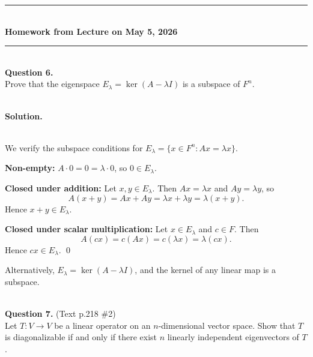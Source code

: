 \documentclass{article}
\begin{document}
\bigskip


\bigskip
\begin{center}
\rule{0.5\textwidth}{1pt}\\[6pt]
\textbf{Homework from Lecture on May 5, 2026}\\[2pt]
\rule{0.5\textwidth}{1pt}
\end{center}
\bigskip


\hfill \break  $~\!\!$ \dotfill \medskip \\
\textbf{Question 6.}\\
Prove that the eigenspace $E_\lambda = \ker(A - \lambda I)$ is a subspace of $F^n$.

\noindent\\
\textbf{Solution.}\\
\quad\\
\begin{mdframed}[linewidth=1pt]
We verify the subspace conditions for $E_\lambda = \{x \in F^n : Ax = \lambda x\}$.

\textbf{Non-empty:} $A \cdot 0 = 0 = \lambda \cdot 0$, so $0 \in E_\lambda$.

\textbf{Closed under addition:} Let $x, y \in E_\lambda$. Then $Ax = \lambda x$ and $Ay = \lambda y$, so
\[
A(x + y) = Ax + Ay = \lambda x + \lambda y = \lambda(x + y).
\]
Hence $x + y \in E_\lambda$.

\textbf{Closed under scalar multiplication:} Let $x \in E_\lambda$ and $c \in F$. Then
\[
A(cx) = c(Ax) = c(\lambda x) = \lambda(cx).
\]
Hence $cx \in E_\lambda$. \qed

Alternatively, $E_\lambda = \ker(A - \lambda I)$, and the kernel of any linear map is a subspace.
\end{mdframed}

\bigskip


\hfill \break  $~\!\!$ \dotfill \medskip \\
\textbf{Question 7.} (Text p.218 \#2)\\
Let $T : V \to V$ be a linear operator on an $n$-dimensional vector space. Show that $T$ is diagonalizable if and only if there exist $n$ linearly independent eigenvectors of $T$.
\end{document}
